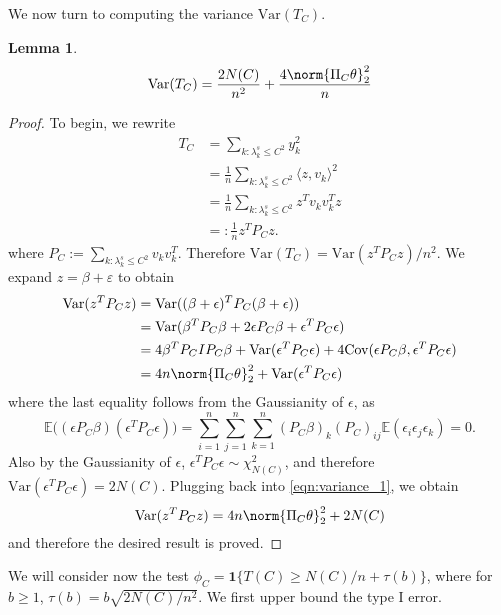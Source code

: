 \documentclass{article}
\newcommand{\dotp}[2]{\langle #1, #2 \rangle}
\newcommand{\Var}{\mathrm{Var}}
\newcommand{\Cov}{\mathrm{Cov}}
\newcommand{\1}{\mathbf{1}}
\newcommand{\Ebb}{\mathbb{E}}
\theoremstyle{alden}
\theoremstyle{aldenthm}
\newtheorem{lemma}{Lemma}
\theoremstyle{definition}
\theoremstyle{remark}
\begin{document}
We now turn to computing the variance $\Var(T_C)$.
\begin{lemma}
	\label{lem:variance}
	\begin{equation*}
	\Var(T_C) = \frac{2N(C)}{n^2} + \frac{4 \norm{\Pi_C \theta}_2^2}{n}
	\end{equation*}
\end{lemma}
\begin{proof}
	To begin, we rewrite
	\begin{align*}
	T_C & = \sum_{k:\lambda_k^s \leq C^2} y_k^2 \\
	& = \frac{1}{n} \sum_{k: \lambda_k^s \leq C^2} \dotp{z}{v_k}^2 \\
	& = \frac{1}{n} \sum_{k: \lambda_k^s \leq C^2} z^T v_k v_k^T z \\
	& =: \frac{1}{n} z^T P_{C} z.
	\end{align*}
	where $P_C := \sum_{k: \lambda_k^s \leq C^2} v_k v_k^T$. Therefore $\Var(T_C) = \Var(z^T P_{C} z)/n^2$. We expand $z = \beta + \varepsilon$ to obtain
	\begin{align}
	\Var(z^T P_{C} z) & = \Var((\beta + \epsilon)^T P_{C} (\beta + \epsilon)) \nonumber \\
	& = \Var(\beta^T P_{C} \beta + 2 \epsilon P_{C} \beta + \epsilon^T P_{C} \epsilon) \nonumber \\
	& = 4 \beta^T P_{C} I P_{C} \beta + \Var(\epsilon^T P_{C} \epsilon) + 4 \Cov(\epsilon P_{C} \beta, \epsilon^T P_{C} \epsilon) \nonumber \\
	& = 4 n \norm{\Pi_C \theta}_2^2 + \Var(\epsilon^T P_{C} \epsilon) \label{eqn:variance_1}
	\end{align}
	where the last equality follows from the Gaussianity of $\epsilon$, as
	\begin{equation*}
	\Ebb\bigl( (\epsilon P_{C} \beta) (\epsilon^T P_{C} \epsilon) \bigr) = \sum_{i = 1}^{n} \sum_{j = 1}^{n} \sum_{k = 1}^{n} (P_C\beta)_k (P_C)_{ij} \Ebb(\epsilon_i \epsilon_j \epsilon_k) = 0.
	\end{equation*}
	Also by the Gaussianity of $\epsilon$, $\epsilon^T P_C \epsilon \sim \chi_{N(C)}^2$, and therefore $\Var(\epsilon^T P_{C} \epsilon) = 2N(C)$. Plugging back into \eqref{eqn:variance_1}, we obtain
	\begin{equation*}
	\Var(z^T P_{C} z) = 4 n \norm{\Pi_C \theta}_2^2 + 2N(C) 
	\end{equation*}
	and therefore the desired result is proved.
\end{proof}

We will consider now the test $\phi_C = \mathbf{1}\{T(C) \geq N(C)/n + \tau(b)\}$, where for $b \geq 1$, $\tau(b) = b \sqrt{2N(C)/n^2}$. We first upper bound the type I error.
\end{document}
